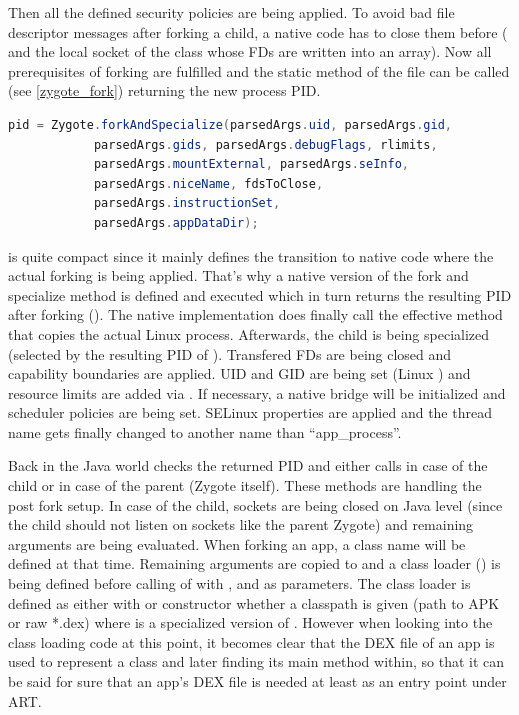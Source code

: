 Then all the defined security policies are being applied. To avoid bad file
descriptor messages after forking a child, a native code has to close them before ( and the local socket  of the
 class whose FDs are written into an 
array).
Now all prerequisites of forking are fulfilled and the static method
 of the  file can be called
(see \autoref{zygote_fork}) returning the new process PID.
\begin{lstlisting}[language=Java, caption=Zygote Fork Call, label=zygote_fork]
pid = Zygote.forkAndSpecialize(parsedArgs.uid, parsedArgs.gid,
            parsedArgs.gids, parsedArgs.debugFlags, rlimits,
            parsedArgs.mountExternal, parsedArgs.seInfo,
            parsedArgs.niceName, fdsToClose,
            parsedArgs.instructionSet,
            parsedArgs.appDataDir);
\end{lstlisting}
 is quite compact since it mainly defines the transition
to native code where the actual forking is being applied. That's why
a native version of the fork and specialize method is defined and executed
which in turn returns the resulting PID after forking
().
The native implementation does finally call the effective  method
that copies the actual Linux process. Afterwards, the child is being
specialized (selected by the resulting PID of ).
Transfered FDs are being closed and capability boundaries are applied.
UID and GID are being set (Linux ) and resource limits are added via .
If necessary, a native bridge will be initialized and scheduler policies
are being set. SELinux properties are applied and the thread name gets finally
changed to another name than ``app\_process''.

Back in the Java world  checks the returned PID and either calls  in case of the child or
 in case of the parent (Zygote itself).
These methods are handling the post fork setup. In case of the child, sockets are being closed on Java level (since the child should not listen on sockets like the parent Zygote) and remaining arguments are being evaluated. When forking an app, a class name will be defined at that time. Remaining arguments are copied to  and a class loader () is being defined before calling  of  with ,  and  as parameters. The class loader  is defined as
either with  or  constructor whether a classpath is
given (path to APK or raw *.dex) where  is a specialized version of .
However when looking into the class loading code at this point, it becomes clear that the DEX file
of an app is used to represent a class and later finding its main method within, so that
it can be said for sure that an app's DEX file is needed at least as an entry point under ART.

